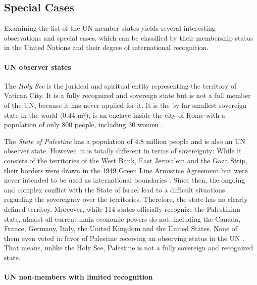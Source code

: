 \subsection{Special Cases} %
\label{sub:special_cases}

Examining the list of the UN member states yields several interesting observations and special cases, which can be classified by their membership status in the United Nations and their degree of international recognition.


\paragraph{UN observer states} %
\label{par:un_observer_states}

The \emph{Holy See} is the juridcal and spiritual entity representing the territory of Vatican City. It is a fully recognized and sovereign state but is not a full member of the UN, because it has never applied for it. It is the by far smallest sovereign state in the world (0.44 m²), is an enclave inside the city of Rome with a population of only 800 people, including 30 women \cite{VaticanPopulation}.

The \emph{State of Palestine} has a population of 4.8 million people \cite[as of 2016]{PalestinePopulation} and is also an UN observer state. However, it is totally different in terms of sovereignty: While it consists of the territories of the West Bank, East Jerusalem and the Gaza Strip, their borders were drawn in the 1949 Green Line Armistice Agreement but were never intended to be used as international boundaries \cite{PalestineTerritory}. Since then, the ongoing and complex conflict with the State of Israel lead to a difficult situations regarding the sovereignty over the territories. Therefore, the state has no clearly defined territoy. Moreover, while 114 states officially recognize the Palestinian state, almost all current main economic powers do not, including the Canada, France, Germany, Italy, the United Kingdom and the United States. None of them even voted in favor of Palestine receiving an observing status in the UN \cite{PalestineUN}. That means, unlike the Holy See, Palestine is not a fully sovereign and recognized state.


\paragraph{UN non-members with limited recognition} %
\label{par:un_non_members_with_limited_recognition}

